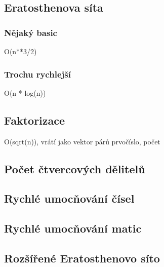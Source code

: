 \documentclass[10pt, a4paper, twoside]{article}
\begin{document}
\subsection{Eratosthenova síta}
\subsubsection{Nějaký basic}
O(n**3/2)


\subsubsection{Trochu rychlejší}
O(n * log(n))


\subsection{Faktorizace}
O(sqrt(n)), vrátí jako vektor párů {prvočíslo, počet}


\subsection{Počet čtvercových dělitelů}


\subsection{Rychlé umocňování čísel}



\subsection{Rychlé umocňování matic}


\subsection{Rozšířené Eratosthenovo síto}

\end{document}

